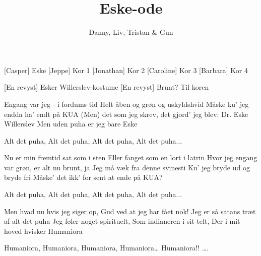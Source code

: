 \documentclass[a4paper,11pt]{article}
\title{Eske-ode}
\author{Danny, Liv, Tristan \& Gun}
\begin{document}
\maketitle

\begin{roles}
  [Casper] Eske
  [Jeppe] Kor 1
  [Jonathan] Kor 2
  [Caroline] Kor 3
  [Barbara] Kor 4
\end{roles}

\begin{props}
    [En revyst] Esker Willerslev-kostume
    [En revyst] Brunt? Til koren
\end{props}

\begin{center}
\end{center}

\begin{song}
 Engang var jeg - i fordums tid
Helt åben og grøn og uskyldshvid
Måske ku’ jeg endda ha’ endt på KUA
(Men) det som jeg skrev, 
det gjord’ jeg blev:
Dr. Eske Willerslev
Men uden puha er jeg bare Eske 


 Alt det puha, Alt det puha, Alt det puha, 
Alt det puha...


 Nu er min fremtid 
sat som i sten
Eller fanget som en lort i latrin
Hvor jeg engang var grøn, er alt nu brunt, ja
Jeg må væk fra denne svinesti
 Ku’ jeg bryde ud og bryde fri
Måske’ det ikk’ for sent at ende på KUA?


 Alt det puha, Alt det puha, Alt det puha, 
Alt det puha...


 Men hvad nu hvis jeg siger op,
Gud ved at jeg har fået nok!
Jeg er så satans træt af alt det puha
Jeg føler noget spirituelt,
Som indianeren i sit telt,
Der i mit hoved hvisker Humaniora

 Humaniora, Humaniora, Humaniora, 
Humaniora…
Humaniora!! ….

\end{song}
\end{document}
